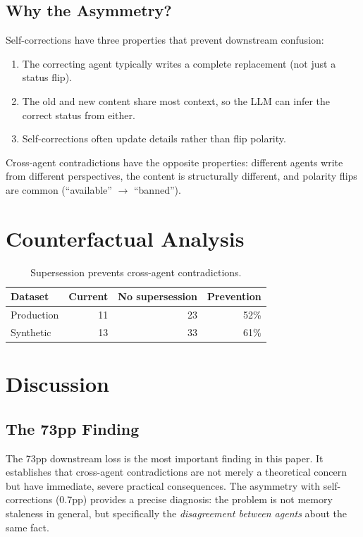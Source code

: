 \documentclass{article}
\begin{document}
\subsection{Why the Asymmetry?}

Self-corrections have three properties that prevent downstream confusion:
\begin{enumerate}
\item The correcting agent typically writes a complete replacement (not just a status flip).
\item The old and new content share most context, so the LLM can infer the correct status from either.
\item Self-corrections often update details rather than flip polarity.
\end{enumerate}

Cross-agent contradictions have the opposite properties: different agents write from different perspectives, the content is structurally different, and polarity flips are common (``available'' $\to$ ``banned'').

\section{Counterfactual Analysis}

\begin{table}[h]
\centering
\caption{Supersession prevents cross-agent contradictions.}
\begin{tabular}{lrrr}
\toprule
Dataset & Current & No supersession & Prevention \\
\midrule
Production & 11 & 23 & 52\% \\
Synthetic & 13 & 33 & 61\% \\
\bottomrule
\end{tabular}
\label{tab:cf}
\end{table}

\section{Discussion}

\subsection{The 73pp Finding}
The 73pp downstream loss is the most important finding in this paper. It establishes that cross-agent contradictions are not merely a theoretical concern but have immediate, severe practical consequences. The asymmetry with self-corrections (0.7pp) provides a precise diagnosis: the problem is not memory staleness in general, but specifically the \emph{disagreement between agents} about the same fact.
\end{document}
